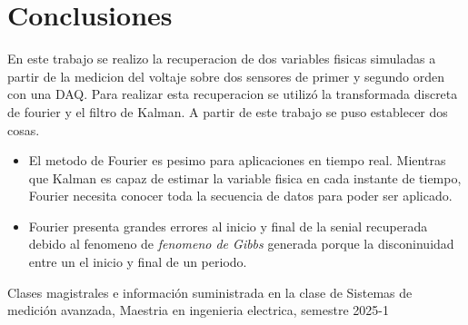 \documentclass[conference]{IEEEtran}
\begin{document}
\section{Conclusiones}

En este trabajo se realizo la recuperacion de dos variables fisicas simuladas a partir de la medicion del voltaje sobre dos sensores de primer y segundo orden con una DAQ. Para realizar esta recuperacion se utiliz\'o la transformada discreta de fourier y el filtro de Kalman. A partir de este trabajo se puso establecer dos cosas.

\begin{itemize}
	\item El metodo de Fourier es pesimo para aplicaciones en tiempo real. Mientras que Kalman es capaz de estimar la variable fisica en cada instante de tiempo, Fourier necesita conocer toda la secuencia de datos para poder ser aplicado.
	\item Fourier presenta grandes errores al inicio y final de la senial recuperada debido al fenomeno de \textit{fenomeno de Gibbs} generada porque la disconinuidad entre un el inicio y final de un periodo.
\end{itemize}

\begin{thebibliography}{00}

	\item Clases magistrales e información suministrada en la clase de Sistemas de medición avanzada, Maestria en ingenieria electrica, semestre 2025-1

\end{thebibliography}
\end{document}
